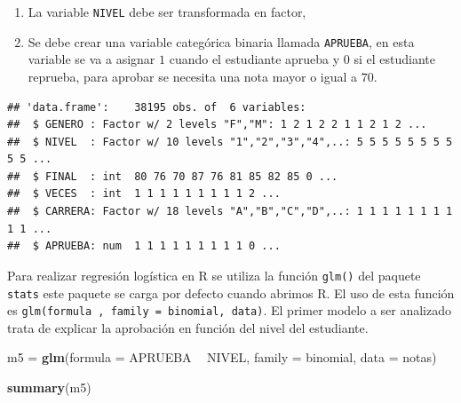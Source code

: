 \documentclass[
]{krantz}
\makeatletter
\newenvironment{Shaded}{\begin{snugshade}}{\end{snugshade}}
\newcommand{\DataTypeTok}[1]{\textcolor[rgb]{0.27,0.27,0.27}{#1}}
\newcommand{\DecValTok}[1]{\textcolor[rgb]{0.06,0.06,0.06}{#1}}
\newcommand{\KeywordTok}[1]{\textcolor[rgb]{0.27,0.27,0.27}{\textbf{#1}}}
\newcommand{\NormalTok}[1]{#1}
\newcommand{\OperatorTok}[1]{\textcolor[rgb]{0.43,0.43,0.43}{\textbf{#1}}}
\newcommand{\StringTok}[1]{\textcolor[rgb]{0.5,0.5,0.5}{#1}}
\providecommand{\tightlist}{%
  \setlength{\itemsep}{0pt}\setlength{\parskip}{0pt}}
\newenvironment{kframe}{%
\medskip{}
\setlength{\fboxsep}{.8em}
 \def\at@end@of@kframe{}%
 \ifinner\ifhmode%
  \def\at@end@of@kframe{\end{minipage}}%
  \begin{minipage}{\columnwidth}%
 \fi\fi%
 \def\FrameCommand##1{\hskip\@totalleftmargin \hskip-\fboxsep
 \colorbox{shadecolor}{##1}\hskip-\fboxsep
     \hskip-\linewidth \hskip-\@totalleftmargin \hskip\columnwidth}%
 \MakeFramed {\advance\hsize-\width
   \@totalleftmargin\z@ \linewidth\hsize
   \@setminipage}}%
 {\par\unskip\endMakeFramed%
 \at@end@of@kframe}
\renewenvironment{Shaded}{\begin{kframe}}{\end{kframe}}
\makeatother
\begin{document}
\begin{enumerate}
\def\labelenumi{\arabic{enumi}.}
\tightlist
\item
  La variable \texttt{NIVEL} debe ser transformada en factor,
\item
  Se debe crear una variable categórica binaria llamada \texttt{APRUEBA}, en esta variable se va a asignar \(1\) cuando el estudiante aprueba y \(0\) si el estudiante reprueba, para aprobar se necesita una nota mayor o igual a \(70\).
\end{enumerate}

\begin{Shaded}
\end{Shaded}

\begin{verbatim}
## 'data.frame':    38195 obs. of  6 variables:
##  $ GENERO : Factor w/ 2 levels "F","M": 1 2 1 2 2 1 1 2 1 2 ...
##  $ NIVEL  : Factor w/ 10 levels "1","2","3","4",..: 5 5 5 5 5 5 5 5 5 5 ...
##  $ FINAL  : int  80 76 70 87 76 81 85 82 85 0 ...
##  $ VECES  : int  1 1 1 1 1 1 1 1 1 2 ...
##  $ CARRERA: Factor w/ 18 levels "A","B","C","D",..: 1 1 1 1 1 1 1 1 1 1 ...
##  $ APRUEBA: num  1 1 1 1 1 1 1 1 1 0 ...
\end{verbatim}

Para realizar regresión logística en R se utiliza la función \texttt{glm()} del paquete \texttt{stats} este paquete se carga por defecto cuando abrimos R. El uso de esta función es \texttt{glm(formula\ ,\ family\ =\ binomial,\ data)}. El primer modelo a ser analizado trata de explicar la aprobación en función del nivel del estudiante.

\begin{Shaded}
\begin{Highlighting}[]
\NormalTok{m5 =}\StringTok{ }\KeywordTok{glm}\NormalTok{(}\DataTypeTok{formula =}\NormalTok{ APRUEBA }\OperatorTok{~}\StringTok{ }\NormalTok{NIVEL, }\DataTypeTok{family =}\NormalTok{ binomial, }\DataTypeTok{data =}\NormalTok{ notas)}

\KeywordTok{summary}\NormalTok{(m5)}
\end{Highlighting}
\end{Shaded}
\end{document}
